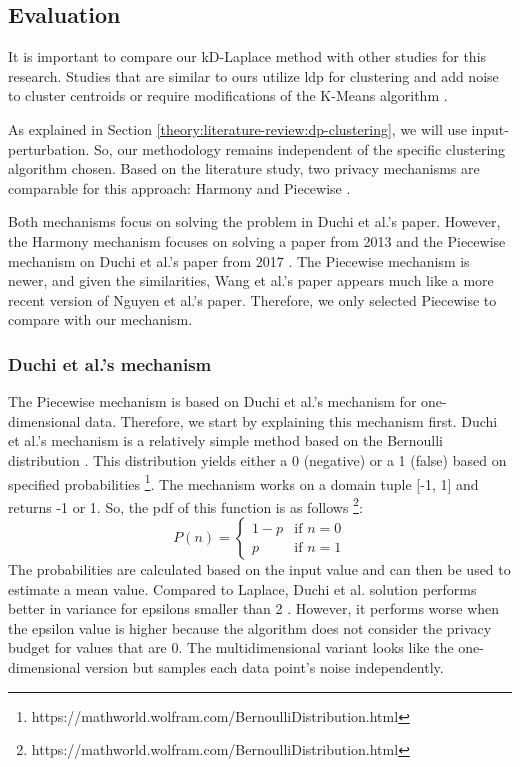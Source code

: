 \subsection{Evaluation}
It is important to compare our kD-Laplace method with other studies for this research.
Studies that are similar to ours utilize \gls{ldp} for clustering and add noise to cluster centroids \citep{xia_distributed_2020, yuan_privacypreserving_2021, 9679364} or require modifications of the K-Means algorithm \citep{sun_distributed_2019}.

As explained in Section \ref{theory:literature-review:dp-clustering}, we will use input-perturbation.
So, our methodology remains independent of the specific clustering algorithm chosen.
Based on the literature study, two privacy mechanisms are comparable for this approach: Harmony \citep{nguyen_collecting_2016} and Piecewise \citep{wang_collecting_2019}.

Both mechanisms focus on solving the problem in Duchi et al.'s paper.
However, the Harmony mechanism focuses on solving a paper from 2013 \citep{duchi_privacy_2013} and the Piecewise mechanism on Duchi et al.'s paper from 2017 \citep{duchi_minimax_2017}.
The Piecewise mechanism is newer, and given the similarities, Wang et al.'s paper appears much like a more recent version of Nguyen et al.'s paper.
Therefore, we only selected Piecewise to compare with our mechanism.

\subsubsection{Duchi et al.'s mechanism}
The Piecewise mechanism is based on Duchi et al.'s mechanism for one-dimensional data.
Therefore, we start by explaining this mechanism first.
Duchi et al.'s mechanism is a relatively simple method based on the Bernoulli distribution \citep{duchi_minimax_2017}.
This distribution yields either a 0 (negative) or a 1 (false) based on specified probabilities \footnote{https://mathworld.wolfram.com/BernoulliDistribution.html}.
The mechanism works on a domain tuple [-1, 1] and returns -1 or 1.
So, the \gls{pdf} of this function is as follows \footnote{https://mathworld.wolfram.com/BernoulliDistribution.html}:
\begin{equation}[H]
  P(n) =
  \begin{cases}
    1 - p & \text{if } n = 0 \\
    p     & \text{if } n = 1
  \end{cases}
\end{equation}
The probabilities are calculated based on the input value and can then be used to estimate a mean value.
Compared to Laplace, Duchi et al. solution performs better in variance for epsilons smaller than 2 \citep{wang_collecting_2019}.
However, it performs worse when the epsilon value is higher because the algorithm does not consider the privacy budget for values that are 0.
The multidimensional variant looks like the one-dimensional version but samples each data point's noise independently.

